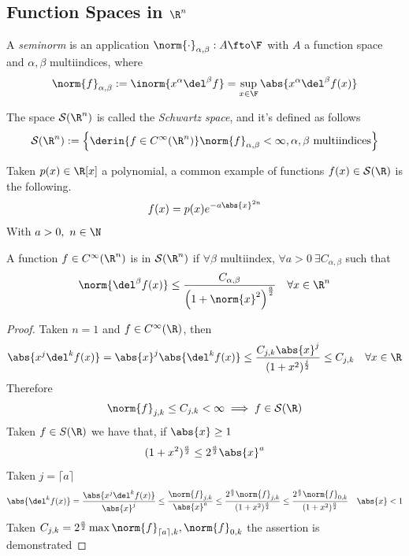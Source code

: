 \documentclass[../mmf.tex]{subfiles}
\begin{document}
\subsection{Function Spaces in $\R^n$}
\begin{dfn}[Seminorm]
	A \textit{seminorm} is an application $\norm{\cdot}_{\alpha,\beta}:A\fto\F$ with $A$ a function space and $\alpha,\beta$ multiindices, where
	\begin{equation}
		\norm{f}_{\alpha,\beta}:=\inorm{x^\alpha\del^\beta f}=\sup_{x\in\F}\abs{x^\alpha\del^\beta f(x)}
		\label{eq:seminorm}
	\end{equation}
\end{dfn}
\begin{dfn}
	The space $\mathcal{S}(\R^n)$ is called the \textit{Schwartz space}, and it's defined as follows
	\begin{equation}
		\mathcal{S}(\R^n):=\left\{ \derin{f\in C^\infty(\R^n)}\norm{f}_{\alpha,\beta}<\infty, \alpha,\beta\text{ multiindices} \right\}
		\label{eq:schwartzspace}
	\end{equation}
\end{dfn}
\begin{eg}
	Taken $p(x)\in\R[x]$ a polynomial, a common example of functions $f(x)\in\mathcal{S}(\R)$ is the following.
	\begin{equation}
		f(x)=p(x)e^{-a\abs{x}^{2n}}
		\label{eq:schwartzfunc}
	\end{equation}
	With $a>0,\ n\in\N$
\end{eg}
\begin{thm}
	A function $f\in C^\infty(\R^n)$ is in $\mathcal{S}(\R^n)$ if $\forall\beta$ multiindex, $\forall a>0\ \exists C_{\alpha,\beta}$ such that
	\begin{equation}
		\norm{\del^\beta f(x)}\le\frac{C_{\alpha,\beta}}{\left( 1+\norm{x}^2 \right)^{\frac{a}{2}}}\quad\forall x\in\R^n
		\label{eq:schwartzfunc2}
	\end{equation}
\end{thm}
\begin{proof}
	Taken $n=1$ and $f\in C^\infty(\R)$, then
	\begin{equation*}
		\abs{x^j\del^kf(x)}=\abs{x}^j\abs{\del^kf(x)}\le\frac{C_{j,k}\abs{x}^j}{(1+x^2)^{\frac{j}{2}}}\le C_{j,k}\quad\forall x\in\R
	\end{equation*}
	Therefore
	\begin{equation*}
		\norm{f}_{j,k}\le C_{j,k}<\infty\implies f\in\mathcal{S}(\R)
	\end{equation*}
	Taken $f\in{S}(\R)$ we have that, if $\abs{x}\ge1$
	\begin{equation*}
		(1+x^2)^{\frac{a}{2}}\le 2^{\frac{a}{2}}\abs{x}^a
	\end{equation*}
	Taken $j=\lceil a\rceil$
	\begin{equation*}
		\abs{\del^kf(x)}=\frac{\abs{x^j\del^kf(x)}}{\abs{x}^j}\le\frac{\norm{f}_{j,k}}{\abs{x}^a}\le\frac{2^{\frac{a}{2}}\norm{f}_{j,k}}{(1+x^2)^{\frac{a}{2}}}\le\frac{2^{\frac{a}{2}}\norm{f}_{0,k}}{(1+x^2)^{\frac{a}{2}}}\quad\abs{x}<1
	\end{equation*}
	Taken $C_{j,k}=2^{\frac{a}{2}}\max{\norm{f}_{\lceil a\rceil,k},\norm{f}_{0,k}}$ the assertion is demonstrated
\end{proof}
\end{document}
